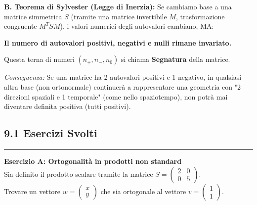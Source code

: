 \documentclass[10pt,a4paper]{article}
\begin{document}
\begin{tcolorbox}[colback=cyan!5!white,colframe=cyan!75!black,title=\textbf{FORMULARIO}]
\textbf{B. Teorema di Sylvester (Legge di Inerzia):}
Se cambiamo base a una matrice simmetrica $S$ (tramite una matrice invertibile $M$, trasformazione congruente $M^T S M$), i valori numerici degli autovalori cambiano, MA:
\begin{center}
    \textbf{Il numero di autovalori positivi, negativi e nulli rimane invariato.}
\end{center}
Questa terna di numeri $(n_+, n_-, n_0)$ si chiama \textbf{Segnatura} della matrice.

\textit{Conseguenza:} Se una matrice ha 2 autovalori positivi e 1 negativo, in qualsiasi altra base (non ortonormale) continuerà a rappresentare una geometria con "2 direzioni spaziali e 1 temporale" (come nello spaziotempo), non potrà mai diventare definita positiva (tutti positivi).
\end{tcolorbox}

\vspace{0.4cm}
\subsection*{9.1 Esercizi Svolti}



\vspace{0.4cm}
\hrule
\vspace{0.4cm}

\textbf{Esercizio A: Ortogonalità in prodotti non standard}
\\ Sia definito il prodotto scalare tramite la matrice $S = \begin{pmatrix} 2 & 0 \\ 0 & 5 \end{pmatrix}$.
\\ Trovare un vettore $w = \begin{pmatrix} x \\ y \end{pmatrix}$ che sia ortogonale al vettore $v = \begin{pmatrix} 1 \\ 1 \end{pmatrix}$.
\end{document}
